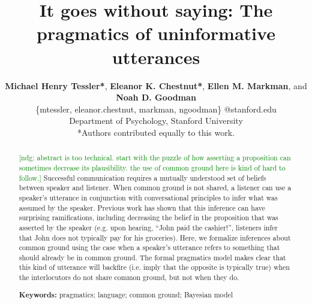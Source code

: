 \documentclass[10pt,letterpaper]{article}
\title{It goes without saying: The pragmatics of uninformative utterances}
\author{ {\large \bf Michael Henry Tessler*}, {\large \bf Eleanor K. Chestnut*},
{\large \bf Ellen M. Markman}, and {\large \bf Noah D. Goodman}  \\
\{mtessler, eleanor.chestnut, markman, ngoodman\} @stanford.edu \\ 
  Department of Psychology, Stanford University \\
  *Authors contributed equally to this work.}
\newcommand{\ndg}[1]{\textcolor{Green}{[ndg: #1]}}
\begin{document}
\maketitle


\begin{abstract}
\ndg{abstract is too technical. start with the puzzle of how asserting a proposition can sometimes decrease its plausibility. the use of common ground here is kind of hard to follow.}
Successful communication requires a mutually understood set of beliefs between speaker and listener.
When common ground is not shared, a listener can use a speaker's utterance in conjunction with conversational principles to infer what was assumed by the speaker.
Previous work has shown that this inference can have surprising ramifications, including decreasing the belief in the proposition that was asserted by the speaker 
(e.g. upon hearing, ``John paid the cashier!'', listeners infer that John does not typically pay for his groceries).
Here, we formalize inferences about common ground using the case when a speaker's utterance refers to something that should already be in common ground.
The formal pragmatics model makes clear that this kind of utterance will backfire (i.e. imply that the opposite is typically true) when the interlocutors do not share common ground, but not when they do.



\textbf{Keywords:} 
pragmatics; language; common ground; Bayesian model

\end{abstract}



%
\end{document}
